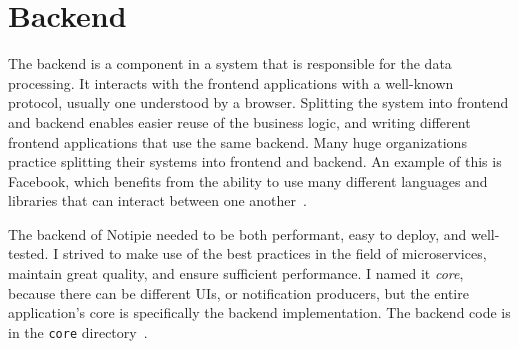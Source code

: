 \section{Backend}\label{sec:backend}

The backend is a component in a system
that is responsible for the data processing.
It interacts with the frontend applications
with a well-known protocol,
usually one understood by a browser.
Splitting the system into frontend and backend
enables easier reuse of the business logic,
and writing different frontend applications
that use the same backend.
Many huge organizations practice splitting
their systems into frontend and backend.
An example of this is Facebook,
which benefits from the ability to use
many different languages and libraries
that can interact between one another~\cite{abdullah_frontend_2014}.

The backend of Notipie
needed to be both performant,
easy to deploy,
and well-tested.
I strived to make use of the best practices
in the field of microservices,
maintain great quality,
and ensure sufficient performance.
I named it \textit{core},
because there can be different \acp{UI},
or notification producers,
but the entire application's core
is specifically the backend implementation.
The backend code
is in the
\texttt{core} directory~\cite{sewera_notipie_2022}.




